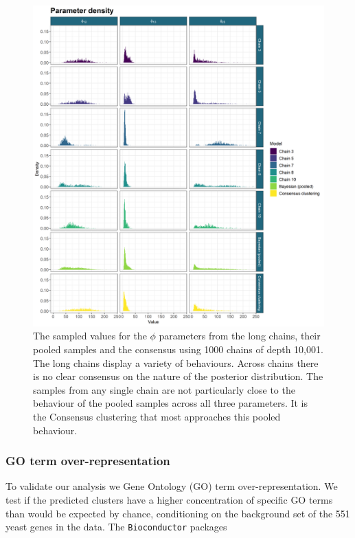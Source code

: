 \documentclass[]{article}
\begin{document}
\begin{figure}
	\centering
	\includegraphics[scale=0.8]{../Images/Yeast/ComparisonDensities.png}
	\caption{The sampled values for the $\phi$ parameters from the long chains, their pooled samples and the consensus using 1000 chains of depth 10,001. The long chains display a variety of behaviours. Across chains there is no clear consensus on the nature of the posterior distribution. The samples from any single chain are not particularly close to the behaviour of the pooled samples across all three parameters. It is the Consensus clustering that most approaches this pooled behaviour.}
	\label{fig:densityComparison}
\end{figure}

\subsubsection{GO term over-representation}
To validate our analysis we Gene Ontology (GO) term over-representation. We test if the predicted clusters have a higher concentration of specific GO terms than would be expected by chance, conditioning on the background set of the 551 yeast genes in the data. The \texttt{Bioconductor} packages \texttt{}



%

  
\end{document}
